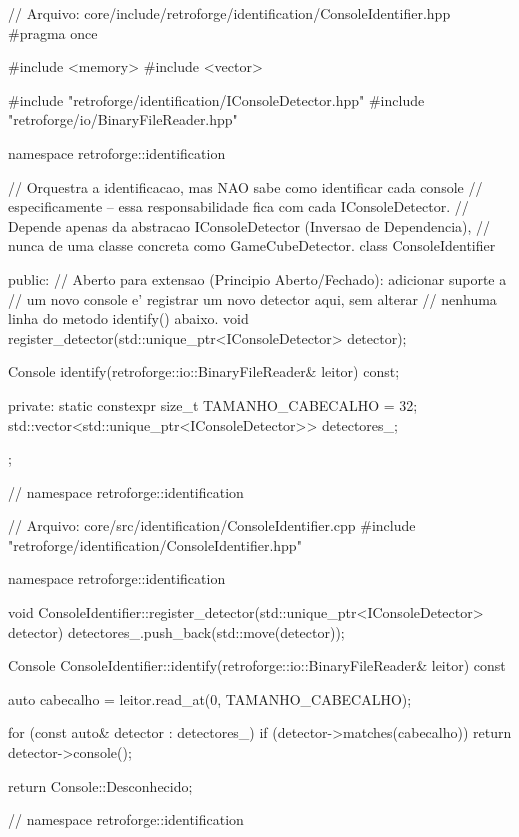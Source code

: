 \begin{CaixaCodigo}
// Arquivo: core/include/retroforge/identification/ConsoleIdentifier.hpp
#pragma once

#include <memory>
#include <vector>

#include "retroforge/identification/IConsoleDetector.hpp"
#include "retroforge/io/BinaryFileReader.hpp"

namespace retroforge::identification {

// Orquestra a identificacao, mas NAO sabe como identificar cada console
// especificamente -- essa responsabilidade fica com cada IConsoleDetector.
// Depende apenas da abstracao IConsoleDetector (Inversao de Dependencia),
// nunca de uma classe concreta como GameCubeDetector.
class ConsoleIdentifier {
public:
    // Aberto para extensao (Principio Aberto/Fechado): adicionar suporte a
    // um novo console e' registrar um novo detector aqui, sem alterar
    // nenhuma linha do metodo identify() abaixo.
    void register_detector(std::unique_ptr<IConsoleDetector> detector);

    Console identify(retroforge::io::BinaryFileReader& leitor) const;

private:
    static constexpr size_t TAMANHO_CABECALHO = 32;
    std::vector<std::unique_ptr<IConsoleDetector>> detectores_;
};

} // namespace retroforge::identification
\end{CaixaCodigo}

\begin{CaixaCodigo}
// Arquivo: core/src/identification/ConsoleIdentifier.cpp
#include "retroforge/identification/ConsoleIdentifier.hpp"

namespace retroforge::identification {

void ConsoleIdentifier::register_detector(std::unique_ptr<IConsoleDetector> detector) {
    detectores_.push_back(std::move(detector));
}

Console ConsoleIdentifier::identify(retroforge::io::BinaryFileReader& leitor) const {
    auto cabecalho = leitor.read_at(0, TAMANHO_CABECALHO);

    for (const auto& detector : detectores_) {
        if (detector->matches(cabecalho)) {
            return detector->console();
        }
    }

    return Console::Desconhecido;
}

} // namespace retroforge::identification
\end{CaixaCodigo}

